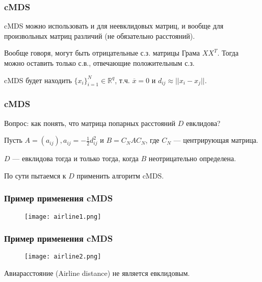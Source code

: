 \documentclass[10pt]{beamer}
\newcommand{\real}{\mathbb{R}}
\begin{document}
\begin{frame}
\frametitle{cMDS}

cMDS можно использовать и для неевклидовых матриц, и вообще для произвольных матриц различий (не обязательно расстояний).

\vspace{\baselineskip}
Вообще говоря, могут быть отрицательные с.з. матрицы Грама $XX^T$. Тогда можно оставить только с.в., отвечающие положительным с.з.

\vspace{\baselineskip}
cMDS будет находить $\{x_i\}_{i=1}^{N} \in \real^q$, т.ч. $\overline{x} = 0$ и $d_{ij} \approx ||x_i - x_j||$.

\end{frame}

\begin{frame}
\frametitle{cMDS}

Вопрос: как понять, что матрица попарных расстояний $D$ евклидова?

\begin{Theorem}
Пусть $A = (a_{ij}), a_{ij} = -\frac{1}{2}d_{ij}^2$ и $B = C_N A C_N$, где $C_N$ --- центрирующая матрица.

$D$ --- евклидова тогда и только тогда, когда $B$ неотрицательно определена.
\end{Theorem}

По сути пытаемся к $D$ применить алгоритм cMDS.
\end{frame}

\begin{frame}
\frametitle{Пример применения cMDS}
\begin{figure}
\centering
        \texttt{[image: airline1.png]}
\end{figure}

\end{frame}

\begin{frame}
\frametitle{Пример применения cMDS}
\begin{figure}
\centering
        \texttt{[image: airline2.png]}
\end{figure}

Авиарасстояние (Airline distance) не является евклидовым. 

\end{frame}
\end{document}
